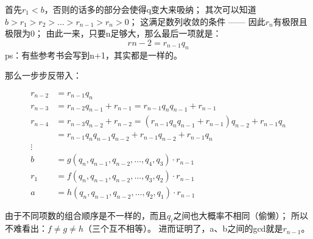 \documentclass[12pt]{article}
\begin{document}
首先$r_{1}<b$，否则的话多的部分会使得q变大来吸纳；
其次可以知道$b>r_{1}>r_{2}>\dots>r_{n-1}>r_{n}>0$；
这满足数列收敛的条件 —— 因此$r_{n}$有极限且极限为0；
由此一来，只要n足够大，那么最后一项就是：
\begin{equation}
    r_{}{n-2} = r_{n-1}q_{n}
\end{equation}
ps：有些参考书会写到n+1，其实都是一样的。

那么一步步反带入：

\begin{align}
    r_{n-2} &= r_{n-1}q_{n}\\
    r_{n-3} &= r_{n-2}q_{n-1}+r_{n-1}=r_{n-1}q_{n}q_{n-1}+r_{n-1}\\
    r_{n-4} &= r_{n-3}q_{n-2}+r_{n-2}=(r_{n-1}q_{n}q_{n-1}+r_{n-1})q_{n-2}+r_{n-1}q_{n}\\ \nonumber
            &=r_{n-1}q_{n}q_{n-1}q_{n-2}+r_{n-1}q_{n-2}+r_{n-1}q_{n}\\
    \vdots\nonumber\\
    b &= g(q_{n},q_{n-1},q_{n-2},\dots,q_{4},q_{3})\cdot r_{n-1}\\
    r_{1} &= f(q_{n},q_{n-1},q_{n-2},\dots,q_{3},q_{2})\cdot r_{n-1}\\
    a &= h(q_{n},q_{n-1},q_{n-2},\dots,q_{2},q_{1})\cdot r_{n-1}
\end{align}

由于不同项数的组合顺序是不一样的，而且$q_{i}$之间也大概率不相同（偷懒）；
所以不难看出：$f\neq g\neq h$（三个互不相等）。
进而证明了，a、b之间的gcd就是$r_{n-1}$。
\end{document}
